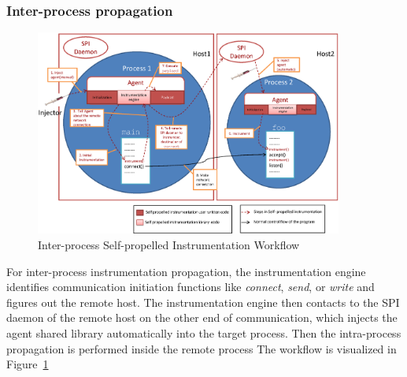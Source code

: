 \subsubsection{Inter-process propagation}
\begin{figure}[ht]
  \centering
  \includegraphics[width=0.90\textwidth]{figure/interprocess.eps}
  \caption{Inter-process Self-propelled Instrumentation Workflow}
  \label{fig:interinst}
\end{figure}

For inter-process instrumentation propagation, the instrumentation engine
identifies communication initiation functions like {\em connect}, {\em send}, or
{\em write} and figures out the remote host.  The instrumentation engine then
contacts to the SPI daemon of the remote host on the other end of communication,
which injects the agent shared library automatically into the target process.
Then the intra-process propagation is performed inside the remote process The
workflow is visualized in Figure~\ref{fig:interinst}

